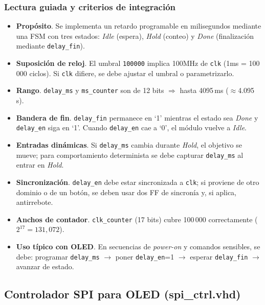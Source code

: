 \documentclass[a4paper,12pt]{article}
\begin{document}
\subsubsection*{Lectura guiada y criterios de integración}
\begin{itemize}
  \item \textbf{Propósito}. Se implementa un retardo programable en milisegundos mediante una FSM con tres estados:
  \emph{Idle} (espera), \emph{Hold} (conteo) y \emph{Done} (finalización mediante \texttt{delay\_fin}).
  \item \textbf{Suposición de reloj}. El umbral \texttt{100000} implica {100}{MHz} de \texttt{clk} ({1}{ms} = 100\,000 ciclos). Si \texttt{clk} difiere, se debe ajustar el umbral o parametrizarlo.
  \item \textbf{Rango}. \texttt{delay\_ms} y \texttt{ms\_counter} son de 12 bits \(\Rightarrow\) hasta 4095\,ms (\(\approx\)4.095\,s).
  \item \textbf{Bandera de fin}. \texttt{delay\_fin} permanece en ‘1’ mientras el estado sea \emph{Done} y \texttt{delay\_en} siga en ‘1’. Cuando \texttt{delay\_en} cae a ‘0’, el módulo vuelve a \emph{Idle}.
  \item \textbf{Entradas dinámicas}. Si \texttt{delay\_ms} cambia durante \emph{Hold}, el objetivo se mueve; para comportamiento determinista se debe capturar \texttt{delay\_ms} al entrar en \emph{Hold}.
  \item \textbf{Sincronización}. \texttt{delay\_en} debe estar sincronizada a \texttt{clk}; si proviene de otro dominio o de un botón, se deben usar dos FF de sincronía y, si aplica, antirrebote.
  \item \textbf{Anchos de contador}. \texttt{clk\_counter} (17 bits) cubre 100\,000 correctamente (\(2^{17}=131{,}072\)).
  \item \textbf{Uso típico con OLED}. En secuencias de \emph{power-on} y comandos sensibles, se debe: programar \texttt{delay\_ms} \(\to\) poner \texttt{delay\_en}=1 \(\to\) esperar \texttt{delay\_fin} \(\to\) avanzar de estado.
\end{itemize}

\newpage


\subsection{Controlador SPI para OLED (spi_ctrl.vhd)}
\label{sec:spi_ctrl}
\end{document}
